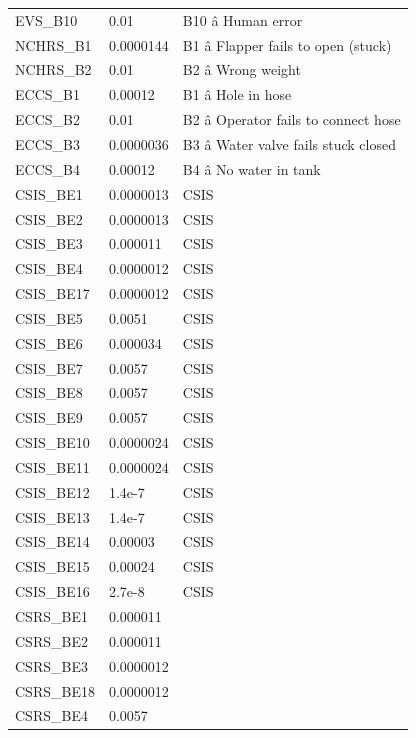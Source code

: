 \documentclass{article}
\begin{document}
\begin{longtable}{>{\raggedright\arraybackslash\hspace{0pt}}p{}>{\raggedright\arraybackslash\hspace{0pt}}p{}>{\raggedright\arraybackslash\hspace{0pt}}p{}}
EVS\_\allowbreak{}B10 & 0.01 & B10 â Human error \\
NCHRS\_\allowbreak{}B1 & 0.0000144 & B1 â Flapper fails to open (\allowbreak{}stuck)\allowbreak{} \\
NCHRS\_\allowbreak{}B2 & 0.01 & B2 â Wrong weight \\
ECCS\_\allowbreak{}B1 & 0.00012 & B1 â Hole in hose \\
ECCS\_\allowbreak{}B2 & 0.01 & B2 â Operator fails to connect hose \\
ECCS\_\allowbreak{}B3 & 0.0000036 & B3 â Water valve fails stuck closed \\
ECCS\_\allowbreak{}B4 & 0.00012 & B4 â No water in tank \\
CSIS\_\allowbreak{}BE1 & 0.0000013 & CSIS \\
CSIS\_\allowbreak{}BE2 & 0.0000013 & CSIS \\
CSIS\_\allowbreak{}BE3 & 0.000011 & CSIS \\
CSIS\_\allowbreak{}BE4 & 0.0000012 & CSIS \\
CSIS\_\allowbreak{}BE17 & 0.0000012 & CSIS \\
CSIS\_\allowbreak{}BE5 & 0.0051 & CSIS \\
CSIS\_\allowbreak{}BE6 & 0.000034 & CSIS \\
CSIS\_\allowbreak{}BE7 & 0.0057 & CSIS \\
CSIS\_\allowbreak{}BE8 & 0.0057 & CSIS \\
CSIS\_\allowbreak{}BE9 & 0.0057 & CSIS \\
CSIS\_\allowbreak{}BE10 & 0.0000024 & CSIS \\
CSIS\_\allowbreak{}BE11 & 0.0000024 & CSIS \\
CSIS\_\allowbreak{}BE12 & 1.4e-\allowbreak{}7 & CSIS \\
CSIS\_\allowbreak{}BE13 & 1.4e-\allowbreak{}7 & CSIS \\
CSIS\_\allowbreak{}BE14 & 0.00003 & CSIS \\
CSIS\_\allowbreak{}BE15 & 0.00024 & CSIS \\
CSIS\_\allowbreak{}BE16 & 2.7e-\allowbreak{}8 & CSIS \\
CSRS\_\allowbreak{}BE1 & 0.000011 &  \\
CSRS\_\allowbreak{}BE2 & 0.000011 &  \\
CSRS\_\allowbreak{}BE3 & 0.0000012 &  \\
CSRS\_\allowbreak{}BE18 & 0.0000012 &  \\
CSRS\_\allowbreak{}BE4 & 0.0057 &  \\

\end{longtable}
\end{document}
